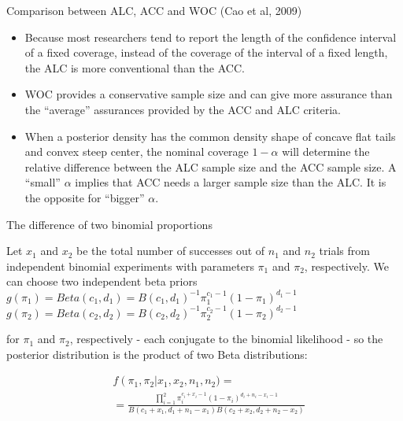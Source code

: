 \documentclass{beamer}
\begin{document}
\begin{frame}{Comparison between ALC, ACC and WOC (Cao et al, 2009)}

\begin{itemize}
\item
  Because most researchers tend to report the length of the confidence
  interval of a fixed coverage, instead of the coverage of the interval
  of a fixed length, the ALC is more conventional than the ACC.
\item
  WOC provides a conservative sample size and can give more assurance
  than the ``average'' assurances provided by the ACC and ALC criteria.
\item
  When a posterior density has the common density shape of concave flat
  tails and convex steep center, the nominal coverage \(1-\alpha\) will
  determine the relative difference between the ALC sample size and the
  ACC sample size. A ``small'' \(\alpha\) implies that ACC needs a
  larger sample size than the ALC. It is the opposite for ``bigger''
  \(\alpha\).
\end{itemize}

\end{frame}



\begin{frame}{The difference of two binomial proportions}

Let \(x_{1}\) and \(x_{2}\) be the total number of successes out of
\(n_{1}\) and \(n_{2}\) trials from independent binomial experiments
with parameters \(\pi_{1}\) and \(\pi_{2}\), respectively. We can choose
two independent beta priors
\(g\left(\pi_{1}\right)=Beta\left(c_{1},d_{1}\right)=B\left(c_{1},d_{1}\right)^{-1}\pi_{1}^{c_{1}-1}\left(1-\pi_{1}\right)^{d_{1}-1}\)
\(g\left(\pi_{2}\right)=Beta\left(c_{2},d_{2}\right)=B\left(c_{2},d_{2}\right)^{-1}\pi_{2}^{c_{2}-1}\left(1-\pi_{2}\right)^{d_{2}-1}\)

for \(\pi_{1}\) and \(\pi_{2}\), respectively - each conjugate to the
binomial likelihood - so the posterior distribution is the product of
two Beta distributions:



\begin{align}
& f\left(\pi_{1},\pi_{2}\right\vert x_{1},x_{2},n_{1},n_{2})= \\
& = \frac {\prod_{i=1}^2 {\pi_{i}^{c_{i}+x_{i}-1}\left(1-\pi_{i}\right)^{d_{i}+n_{i}-x_{i}-1}}} {B\left(c_{1}+x_{1},d_{1}+n_{1}-x_{1}\right)B\left(c_{2}+x_{2},d_{2}+n_{2}-x_{2}\right)}
\end{align}


\end{frame}
\end{document}
